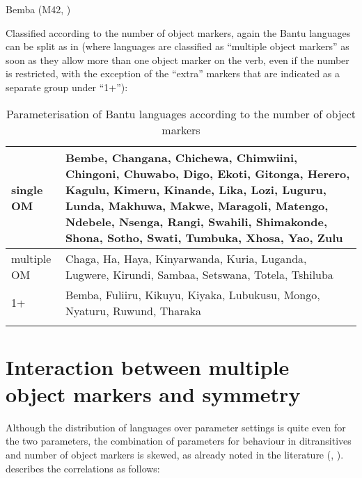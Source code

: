 \documentclass[output=paper
,modfonts
,nonflat]{langsci/langscibook}
\begin{document}
\begin{exe}
\ex Bemba (M42, \citealt[245]{Marten_Kula2012})\label{ex-vdwal:7}
	\xlist
	\endxlist
\end{exe}
Classified according to the number of object markers, again the Bantu languages can be split as in  (where languages are classified as ``multiple object markers'' as soon as they allow more than one object marker on the verb, even if the number is restricted, with the exception of the ``extra'' markers that are indicated as a separate group under “1+”):

\begin{table}
\caption{Parameterisation of Bantu languages according to the number of object markers}	
\label{Table 2}
\begin{tabularx}{\textwidth}{lX} 
	\lsptoprule
	single OM & Bembe, Changana, Chichewa, Chimwiini, Chingoni, Chuwabo, Digo, Ekoti, Gitonga, Herero, Kagulu, Kimeru, Kinande, Lika, Lozi, Luguru, Lunda, Makhuwa, Makwe, Maragoli, Matengo, Ndebele, Nsenga, Rangi, Swahili, Shimakonde, Shona, Sotho, Swati, Tumbuka, Xhosa, Yao, Zulu\\\midrule
	multiple OM & Chaga, Ha, Haya, Kinyarwanda, Kuria, Luganda, Lugwere, Kirundi, Sambaa, Setswana, Totela, Tshiluba\\\midrule
	1+ & Bemba, Fuliiru, Kikuyu, Kiyaka, Lubukusu, Mongo, Nyaturu, Ruwund, Tharaka\\ 
	\lspbottomrule
\end{tabularx}
\end{table}

\section{Interaction between multiple object markers and symmetry} \label{sec-vdwal:3}

Although the distribution of languages over parameter settings is quite even for the two parameters, the combination of parameters for behaviour in ditransitives and number of object markers is skewed, as already noted in the literature (\citealt[185]{Henderson2006}, \citealt[227]{Zeller_Ngoboka2015}). \citet{Riedel2009} describes the correlations as follows:
\end{document}
